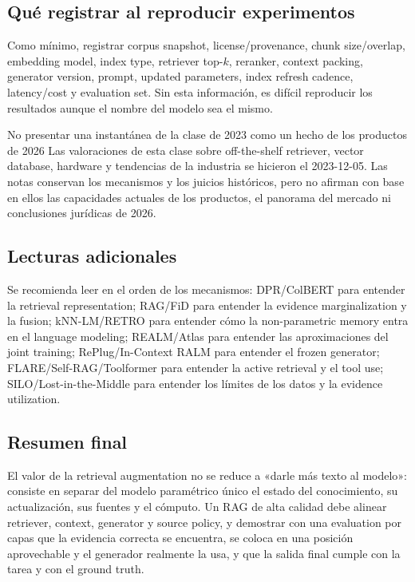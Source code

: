 \subsection{Qué registrar al reproducir experimentos}

Como mínimo, registrar corpus snapshot, license/provenance, chunk size/overlap, embedding model, index type, retriever top-$k$, reranker, context packing, generator version, prompt, updated parameters, index refresh cadence, latency/cost y evaluation set. Sin esta información, es difícil reproducir los resultados aunque el nombre del modelo sea el mismo.

\begin{warningbox}{No presentar una instantánea de la clase de 2023 como un hecho de los productos de 2026}
Las valoraciones de esta clase sobre off-the-shelf retriever, vector database, hardware y tendencias de la industria se hicieron el 2023-12-05. Las notas conservan los mecanismos y los juicios históricos, pero no afirman con base en ellos las capacidades actuales de los productos, el panorama del mercado ni conclusiones jurídicas de 2026.
\end{warningbox}

\subsection{Lecturas adicionales}

Se recomienda leer en el orden de los mecanismos: DPR/ColBERT para entender la retrieval representation; RAG/FiD para entender la evidence marginalization y la fusion; kNN-LM/RETRO para entender cómo la non-parametric memory entra en el language modeling; REALM/Atlas para entender las aproximaciones del joint training; RePlug/In-Context RALM para entender el frozen generator; FLARE/Self-RAG/Toolformer para entender la active retrieval y el tool use; SILO/Lost-in-the-Middle para entender los límites de los datos y la evidence utilization.

\subsection{Resumen final}

El valor de la retrieval augmentation no se reduce a «darle más texto al modelo»: consiste en separar del modelo paramétrico único el estado del conocimiento, su actualización, sus fuentes y el cómputo. Un RAG de alta calidad debe alinear retriever, context, generator y source policy, y demostrar con una evaluation por capas que la evidencia correcta se encuentra, se coloca en una posición aprovechable y el generador realmente la usa, y que la salida final cumple con la tarea y con el ground truth.


